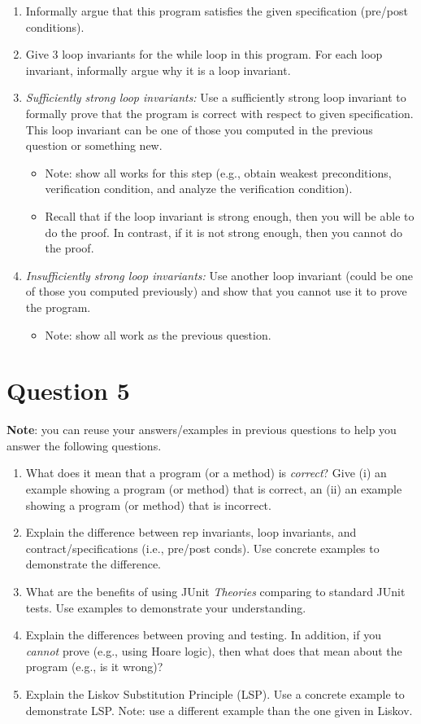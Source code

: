 \documentclass[10pt]{article}
\begin{document}
\begin{enumerate}
\item Informally argue that this program satisfies the given specification (pre/post conditions).
\item Give 3 loop invariants for the while loop in this program. For each loop invariant, informally argue why it is a loop invariant.  
\item \emph{Sufficiently strong loop invariants:}  Use a sufficiently strong loop invariant to formally prove that the program is correct with respect to given specification. This loop invariant can be one of those you computed in the previous question or something new.
  \begin{itemize}
    \item Note: show all works for this step (e.g., obtain weakest preconditions, verification condition, and analyze the verification condition).
  \item Recall that if the loop invariant is strong enough, then you will be able to do the proof. In contrast, if it is not strong enough, then you cannot do the proof.
  \end{itemize}
\item \emph{Insufficiently strong loop invariants:} Use another loop invariant (could be one of those you computed previously) and show that you cannot use it to prove the program. 
  \begin{itemize}
    \item Note: show all work as the previous question.
  \end{itemize}
\end{enumerate}

\newpage
\section{Question 5}

\textbf{Note}: you can reuse your answers/examples in previous questions to help you answer the following questions.

\begin{enumerate}
  \item What does it mean that a program (or a method) is \emph{correct}?  Give (i) an example showing a program (or method) that is correct, an (ii) an example showing a program (or method) that is incorrect.  
  \item Explain the difference between rep invariants, loop invariants, and contract/specifications (i.e., pre/post conds).  Use concrete examples to demonstrate the difference.  
  \item What are the benefits of using JUnit \emph{Theories} comparing to standard JUnit tests. Use examples to demonstrate your understanding.  
  \item Explain the differences between proving and testing.  In addition, if you \emph{cannot} prove (e.g., using Hoare logic), then what does that mean about the program (e.g., is it wrong)? 
  \item Explain the Liskov Substitution Principle (LSP).  Use a concrete example to demonstrate LSP. Note: use a different example than the one given in Liskov.  
\end{enumerate}
\end{document}
